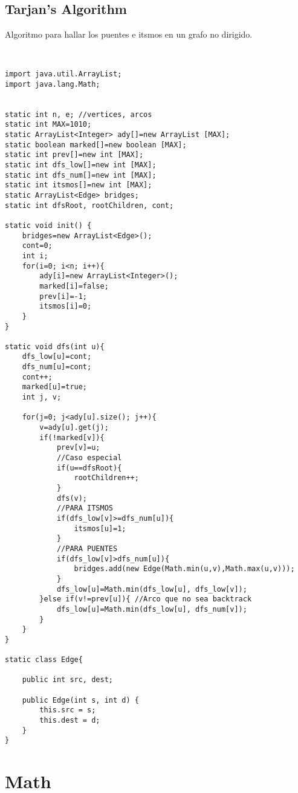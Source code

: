 \documentclass[11pt,letterpaper,twocolumn,twosided]{article}
\begin{document}
\subsection{Tarjan's Algorithm}
Algoritmo para hallar los puentes e itsmos en un grafo no dirigido.
\begin{lstlisting}


import java.util.ArrayList;
import java.lang.Math;


static int n, e; //vertices, arcos
static int MAX=1010;     
static ArrayList<Integer> ady[]=new ArrayList [MAX];
static boolean marked[]=new boolean [MAX];
static int prev[]=new int [MAX];
static int dfs_low[]=new int [MAX];
static int dfs_num[]=new int [MAX];
static int itsmos[]=new int [MAX];
static ArrayList<Edge> bridges;
static int dfsRoot, rootChildren, cont;

static void init() {
    bridges=new ArrayList<Edge>();
    cont=0;
    int i;
    for(i=0; i<n; i++){
        ady[i]=new ArrayList<Integer>();
        marked[i]=false;
        prev[i]=-1;
        itsmos[i]=0;
    }
}

static void dfs(int u){
    dfs_low[u]=cont;
    dfs_num[u]=cont;
    cont++;
    marked[u]=true;
    int j, v;

    for(j=0; j<ady[u].size(); j++){
        v=ady[u].get(j);
        if(!marked[v]){
            prev[v]=u;
            //Caso especial 
            if(u==dfsRoot){
                rootChildren++;
            }
            dfs(v);
            //PARA ITSMOS
            if(dfs_low[v]>=dfs_num[u]){
                itsmos[u]=1;
            }
            //PARA PUENTES
            if(dfs_low[v]>dfs_num[u]){
                bridges.add(new Edge(Math.min(u,v),Math.max(u,v)));
            }
            dfs_low[u]=Math.min(dfs_low[u], dfs_low[v]);
        }else if(v!=prev[u]){ //Arco que no sea backtrack
            dfs_low[u]=Math.min(dfs_low[u], dfs_num[v]);
        }
    }
}

static class Edge{

    public int src, dest;
    
    public Edge(int s, int d) {
        this.src = s;
        this.dest = d;
    }
}

\end{lstlisting}

\section{Math}
\end{document}
